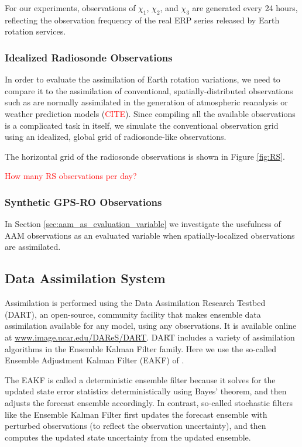 For our experiments, observations of $\chi_1$, $\chi_2$, and $\chi_3$ are generated every 24 hours, reflecting the observation frequency of the real ERP series released by Earth rotation services.  


\subsubsection{Idealized Radiosonde Observations}
\label{sec:radiosondes}

In order to evaluate  the assimilation of Earth rotation variations, we need to compare it to the assimilation of conventional, spatially-distributed observations such as are normally assimilated in the generation of atmospheric reanalysis \citep{Dee2005} or weather prediction models (\textcolor{red}{CITE}).
Since compiling all the available observations is a complicated task in itself, we simulate the conventional observation grid using an idealized, global grid of radiosonde-like observations.  

The horizontal grid of the radiosonde observations is shown in Figure \ref{fig:RS}.

\textcolor{red}{How many RS observations per day?}


\subsubsection{Synthetic GPS-RO Observations}
\label{sec:gpsro}

In Section \ref{sec:aam_as_evaluation_variable} we investigate the usefulness of AAM observations as an evaluated variable when spatially-localized observations are assimilated.  



\subsection{Data Assimilation System}
\label{sec:DAS}
Assimilation is performed using the Data Assimilation Research Testbed (DART), an open-source, community facility that makes ensemble data assimilation available for any model, using any observations.
It is available online at \url{www.image.ucar.edu/DAReS/DART}.
DART includes a variety of assimilation algorithms in the Ensemble Kalman Filter family.
Here we use the so-called Ensemble Adjustment Kalman Filter (EAKF) of \citet{anderson2001}.

The EAKF is called a deterministic ensemble filter because it solves for the updated state error statistics deterministically using Bayes' theorem, and then adjusts the forecast ensemble accordingly.
In contrast, so-called stochastic filters like the Ensemble Kalman Filter  \citep{evensen2003, burgers} first updates the forecast ensemble with perturbed observations (to reflect the observation uncertainty), and then computes the updated state uncertainty from the updated ensemble.

